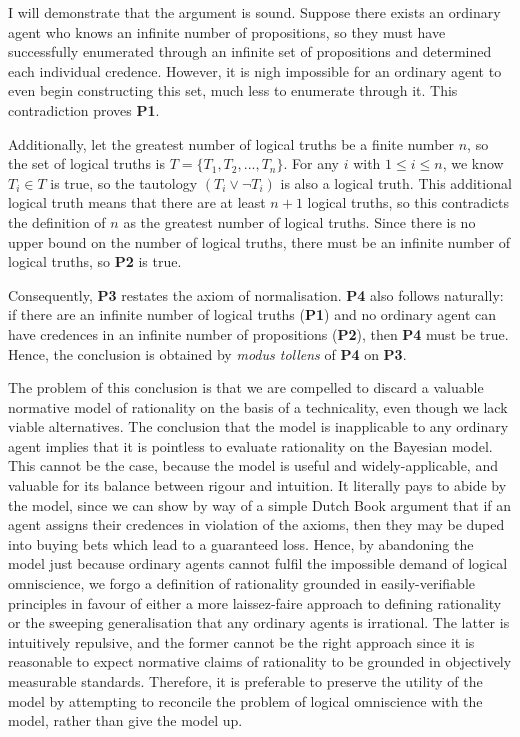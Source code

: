 \documentclass[12pt]{article}
\begin{document}
I will demonstrate that the argument is sound. Suppose there exists an ordinary agent who knows an infinite number of propositions, so they must have successfully enumerated through an infinite set of propositions and determined each individual credence. However, it is nigh impossible for an ordinary agent to even begin constructing this set, much less to enumerate through it. This contradiction proves \textbf{P1}.

Additionally, let the greatest number of logical truths be a finite number $n$, so the set of logical truths is $T=\{T_1,T_2,...,T_n\}$. For any $i$ with $1\leq i\leq n$, we know $T_i\in T$ is true, so the tautology $(T_i\lor\lnot T_i)$ is also a logical truth. This additional logical truth means that there are at least $n+1$ logical truths, so this contradicts the definition of $n$ as the greatest number of logical truths. Since there is no upper bound on the number of logical truths, there must be an infinite number of logical truths, so \textbf{P2} is true.

Consequently, \textbf{P3} restates the axiom of normalisation. \textbf{P4} also follows naturally: if there are an infinite number of logical truths (\textbf{P1}) and no ordinary agent can have credences in an infinite number of propositions (\textbf{P2}), then \textbf{P4} must be true. Hence, the conclusion is obtained by \textit{modus tollens} of \textbf{P4} on \textbf{P3}.

The problem of this conclusion is that we are compelled to discard a valuable normative model of rationality on the basis of a technicality, even though we lack viable alternatives. The conclusion that the model is inapplicable to any ordinary agent implies that it is pointless to evaluate rationality on the Bayesian model. This cannot be the case, because the model is useful and widely-applicable, and valuable for its balance between rigour and intuition. It literally pays to abide by the model, since we can show by way of a simple Dutch Book argument that if an agent assigns their credences in violation of the axioms, then they may be duped into buying bets which lead to a guaranteed loss.\autocite[44]{bdrc} Hence, by abandoning the model just because ordinary agents cannot fulfil the impossible demand of logical omniscience, we forgo a definition of rationality grounded in easily-verifiable principles in favour of either a more laissez-faire approach to defining rationality or the sweeping generalisation that any ordinary agents is irrational. The latter is intuitively repulsive, and the former cannot be the right approach since it is reasonable to expect normative claims of rationality to be grounded in objectively measurable standards. Therefore, it is preferable to preserve the utility of the model by attempting to reconcile the problem of logical omniscience with the model, rather than give the model up.
\end{document}
